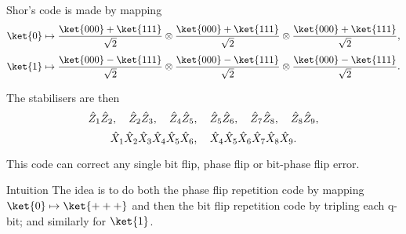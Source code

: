 \documentclass[a4paper]{article}
\begin{document}
\begin{parag}{Shor's code}
     is made by mapping 
    \[\ket{0} \mapsto \frac{\ket{000} + \ket{111}}{\sqrt{2}} \otimes \frac{\ket{000} + \ket{111}}{\sqrt{2}} \otimes \frac{\ket{000} + \ket{111}}{\sqrt{2}},\]
    \[\ket{1} \mapsto \frac{\ket{000} - \ket{111}}{\sqrt{2}} \otimes \frac{\ket{000} - \ket{111}}{\sqrt{2}} \otimes \frac{\ket{000} - \ket{111}}{\sqrt{2}}.\]

    The stabilisers are then 
    \[\hat{Z}_1 \hat{Z}_2, \quad \hat{Z}_2 \hat{Z}_3, \quad \hat{Z}_4 \hat{Z}_5, \quad \hat{Z}_5 \hat{Z}_6, \quad \hat{Z}_7 \hat{Z}_8, \quad \hat{Z}_8 \hat{Z}_9,\] 
    \[\hat{X}_1 \hat{X}_2 \hat{X}_3 \hat{X}_4 \hat{X}_5 \hat{X}_6, \quad \hat{X}_4 \hat{X}_5 \hat{X}_6 \hat{X}_7 \hat{X}_8 \hat{X}_9.\]

    This code can correct any single bit flip, phase flip or bit-phase flip error.
    
    \begin{subparag}{Intuition}
        The idea is to do both the phase flip repetition code by mapping $\ket{0} \mapsto \ket{+++}$ and then the bit flip repetition code by tripling each q-bit; and similarly for $\ket{1}$.
    \end{subparag}
\end{parag}
\end{document}
